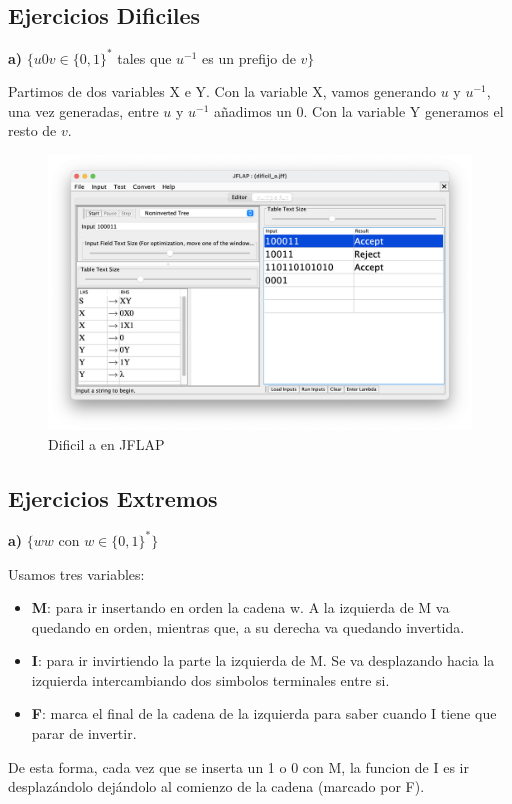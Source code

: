 \subsection{Ejercicios Dificiles}

\textbf{a)}  $\{ u0v \in \{0,1\}^{\ast} $ tales que $u^{-1}$ es un prefijo de $v\}$

Partimos de dos variables X e Y. Con la variable X, vamos generando $u$ y $u^{-1}$, una vez generadas, entre $u$ y $u^{-1}$ añadimos un 0. Con la variable Y generamos el resto de $v$.


\begin{figure}[H] 
	\centering
	\includegraphics[scale=0.35]{../practica_1/images/dificil_a.png} 
	\caption{Dificil a en JFLAP} 
    \label{fig:dificil_a}
\end{figure}

\subsection{Ejercicios Extremos}

\textbf{a)}  $\{ ww$ con $w \in \{0,1\}^{\ast}\}$

Usamos tres variables:
\begin{itemize}
\item \textbf{M}: para ir insertando en orden la cadena w. A la izquierda de M va quedando en orden, mientras que, a su derecha va quedando invertida.
\item \textbf{I}: para ir invirtiendo la parte la izquierda de M. Se va desplazando hacia la izquierda intercambiando dos simbolos terminales entre si.
\item \textbf{F}: marca el final de la cadena de la izquierda para saber cuando I tiene que parar de invertir. 
\end{itemize}
De esta forma, cada vez que se inserta un 1 o 0 con M, la funcion de I es ir desplazándolo dejándolo al comienzo de la cadena (marcado por F).

